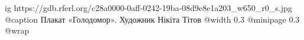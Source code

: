  
 
 
 
 

\ifcmt
  ig https://gdb.rferl.org/c28a0000-0aff-0242-19ba-08d9e8e1a203_w650_r0_s.jpg
  @caption Плакат «Голодомор». Художник Нікіта Тітов
  @width 0.3
  @minipage 0.3
  @wrap \parpic[r]
\fi
